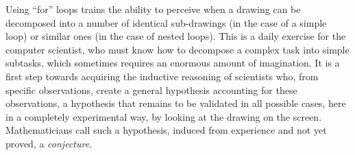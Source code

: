 {\begin{minipage}{\myparboxwidth}
Using ``for'' loops trains the ability to perceive
when a drawing can be decomposed into a number of identical
sub-drawings (in the case of a simple loop) or similar ones (in the case
of nested loops). This is a daily exercise for the computer scientist,
who must know how to decompose a complex task into simple subtasks,
which sometimes requires an enormous amount of imagination.
It is a first step towards acquiring the inductive
reasoning of sci\-en\-tists who, from specific observations,
create a general hypothesis accounting for these observations,
a hypothesis that remains to be validated in all possible cases, here in
a completely experimental way, by looking at the drawing on
the screen. Mathematicians call such a hypothesis,
induced from experience and not yet proved, a {\em conjecture}.

\vspace{\abovedisplayskip}
\end{minipage}
}

